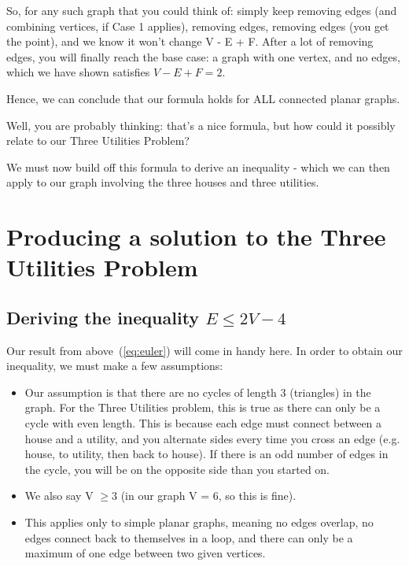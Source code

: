 \documentclass{article}
\begin{document}
So, for any such graph that you could think of: simply keep removing edges (and combining vertices, if Case 1 applies), removing edges, removing edges (you get the point), and we know it won’t change V - E + F. After a lot of removing edges, you will finally reach the base case: a graph with one vertex, and no edges, which we have shown satisfies $V - E + F = 2$. 

Hence, we can conclude that our formula holds for ALL connected planar graphs.

Well, you are probably thinking: that’s a nice formula, but how could it possibly relate to our Three Utilities Problem?

We must now build off this formula to derive an inequality - which we can then apply to our graph involving the three houses and three utilities.

\section{Producing a solution to the Three Utilities Problem}
\subsection{Deriving the inequality \texorpdfstring{$E \leq 2V - 4$}{E =< 2V - 4}}
\label{subsec:inequal}
Our result from above~(\ref{eq:euler}) will come in handy here. In order to obtain our inequality, we must make a few assumptions: 
\vspace{-6pt}
\begin{itemize}
  \item[-] Our assumption is that there are no cycles of length 3 (triangles) in the graph. For the Three Utilities problem, this is true as there can only be a cycle with even length. This is because each edge must connect between a house and a utility, and you alternate sides every time you cross an edge (e.g. house, to utility, then back to house). If there is an odd number of edges in the cycle, you will be on the opposite side than you started on.
  \item[-]  We also say V $\geq 3$ (in our graph V = 6, so this is fine).
  \item[-] This applies only to simple planar graphs, meaning no edges overlap, no edges connect back to themselves in a loop, and there can only be a maximum of one edge between two given vertices.
\end{itemize}
\vspace{-6pt}
\end{document}
